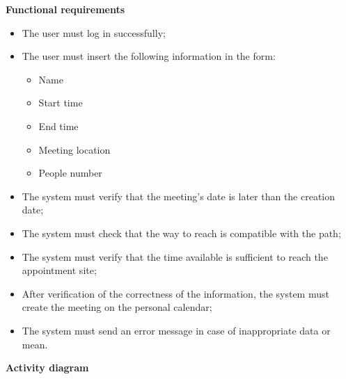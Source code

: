 \documentclass{article}
\begin{document}
	\bigskip
	\noindent
	\newpage
	\textbf{Functional requirements} \\
	\begin{itemize}
		\item The user must log in successfully;
		\item The user must insert the following information in the form:
			\begin{itemize}
				\item Name
				\item Start time
				\item End time
				\item Meeting location
				\item People number
			\end{itemize}
		\item The system must verify that the meeting's date is later than the creation date;
		\item The system must check that the way to reach is compatible with the path;
		\item The system must verify that the time available is sufficient to reach the appointment site;
		\item After verification of the correctness of the information, the system must create the meeting on the personal calendar;
		\item The system must send an error message in case of inappropriate data or mean.
	\end{itemize}
	
	\newpage
	\noindent
	\textbf{Activity diagram} \\
	
\end{document}
